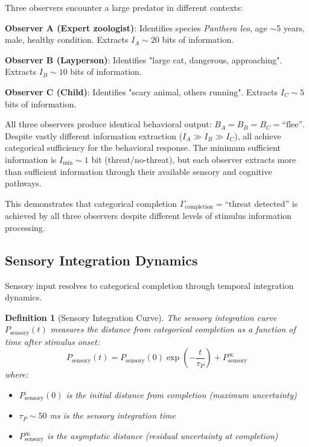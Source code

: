 \documentclass[aps,prd,twocolumn,superscriptaddress,floatfix,nofootinbib]{revtex4-2}
\newtheorem{definition}[theorem]{Definition}
\theoremstyle{remark}
\begin{document}
\begin{example}
\label{ex:threat}
Three observers encounter a large predator in different contexts:

\textbf{Observer A (Expert zoologist)}: Identifies species \emph{Panthera leo}, age $\sim$5 years, male, healthy condition. Extracts $I_A \sim 20$ bits of information.

\textbf{Observer B (Layperson)}: Identifies "large cat, dangerous, approaching". Extracts $I_B \sim 10$ bits of information.

\textbf{Observer C (Child)}: Identifies "scary animal, others running". Extracts $I_C \sim 5$ bits of information.

All three observers produce identical behavioral output: $B_A = B_B = B_C = \text{``flee''}$. Despite vastly different information extraction ($I_A \gg I_B \gg I_C$), all achieve categorical sufficiency for the behavioral response. The minimum sufficient information is $I_{\text{min}} \sim 1$ bit (threat/no-threat), but each observer extracts more than sufficient information through their available sensory and cognitive pathways.

This demonstrates that categorical completion $\Gamma_{\text{completion}} = \text{``threat detected''}$ is achieved by all three observers despite different levels of stimulus information processing.
\end{example}

\subsection{Sensory Integration Dynamics}

Sensory input resolves to categorical completion through temporal integration dynamics.

\begin{definition}[Sensory Integration Curve]
\label{def:perception_decay}
The sensory integration curve $P_{\text{sensory}}(t)$ measures the distance from categorical completion as a function of time after stimulus onset:
\begin{equation}
P_{\text{sensory}}(t) = P_{\text{sensory}}(0) \exp\left(-\frac{t}{\tau_P}\right) + P_{\text{sensory}}^{\infty}
\end{equation}
where:
\begin{itemize}
\item $P_{\text{sensory}}(0)$ is the initial distance from completion (maximum uncertainty)
\item $\tau_P \sim 50$ ms is the sensory integration time~\cite{thorpe1996speed,vanrullen2001temporal}
\item $P_{\text{sensory}}^{\infty}$ is the asymptotic distance (residual uncertainty at completion)
\end{itemize}
\end{definition}
\end{document}
